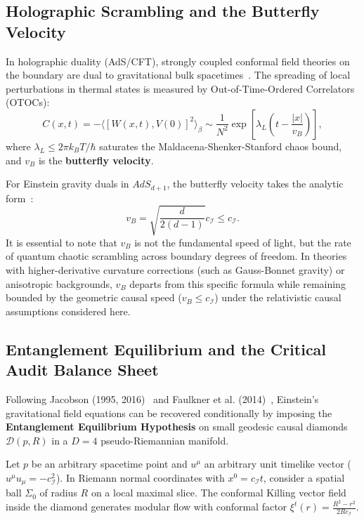 \documentclass[11pt,a4paper]{article}
\begin{document}
\subsection{Holographic Scrambling and the Butterfly Velocity}

In holographic duality (AdS/CFT), strongly coupled conformal field theories on the boundary are dual to gravitational bulk spacetimes~\cite{maldacena1998,ryu2006}. The spreading of local perturbations in thermal states is measured by Out-of-Time-Ordered Correlators (OTOCs):
\begin{equation}
C(x, t) = -\langle [W(x, t), V(0)]^2 \rangle_\beta \sim \frac{1}{N^2} \exp\left[ \lambda_L \left( t - \frac{|x|}{v_B} \right) \right],
\end{equation}
where $\lambda_L \le 2\pi k_B T / \hbar$ saturates the Maldacena-Shenker-Stanford chaos bound, and $v_B$ is the \textbf{butterfly velocity}.

For Einstein gravity duals in $AdS_{d+1}$, the butterfly velocity takes the analytic form~\cite{roberts2016}:
\begin{equation}
v_B = \sqrt{\frac{d}{2(d-1)}} c_{\mathcal{I}} \le c_{\mathcal{I}}.
\end{equation}
It is essential to note that $v_B$ is not the fundamental speed of light, but the rate of quantum chaotic scrambling across boundary degrees of freedom. In theories with higher-derivative curvature corrections (such as Gauss-Bonnet gravity) or anisotropic backgrounds, $v_B$ departs from this specific formula while remaining bounded by the geometric causal speed ($v_B \le c_{\mathcal{I}}$) under the relativistic causal assumptions considered here.

\subsection{Entanglement Equilibrium and the Critical Audit Balance Sheet}

Following Jacobson (1995, 2016)~\cite{jacobson1995,jacobson2016} and Faulkner et al. (2014)~\cite{faulkner2014}, Einstein's gravitational field equations can be recovered conditionally by imposing the \textbf{Entanglement Equilibrium Hypothesis} on small geodesic causal diamonds $\mathcal{D}(p, R)$ in a $D=4$ pseudo-Riemannian manifold.

Let $p$ be an arbitrary spacetime point and $u^\mu$ an arbitrary unit timelike vector ($u^\mu u_\mu = -c_{\mathcal{I}}^2$). In Riemann normal coordinates with $x^0 = c_{\mathcal{I}} t$, consider a spatial ball $\Sigma_0$ of radius $R$ on a local maximal slice. The conformal Killing vector field inside the diamond generates modular flow with conformal factor $\xi^t(r) = \frac{R^2 - r^2}{2 R c_{\mathcal{I}}}$.
\end{document}
